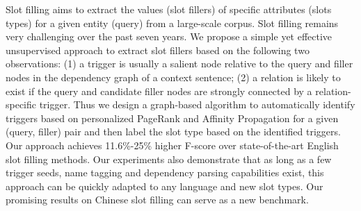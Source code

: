 Slot filling aims to extract the values (slot fillers) of specific attributes (slots types) for a given entity (query) from a large-scale corpus. Slot filling remains very challenging over the past seven years. We propose a simple yet effective unsupervised approach to extract slot fillers based on the following two observations: (1) a trigger is usually a salient node relative to the query and filler nodes in the dependency graph of a context sentence; (2) a relation is likely to exist if the query and candidate filler nodes are strongly connected by a relation-specific trigger. Thus we design a graph-based algorithm to automatically identify triggers based on personalized PageRank and Affinity Propagation for a given (query, filler) pair and then label the slot type based on the identified triggers. Our approach achieves 11.6\%-25\% higher F-score over state-of-the-art English slot filling methods. Our experiments also demonstrate that as long as a few trigger seeds, name tagging and dependency parsing capabilities exist, this approach can be quickly adapted to any language and new slot types. Our promising results on Chinese slot filling can serve as a new benchmark.
